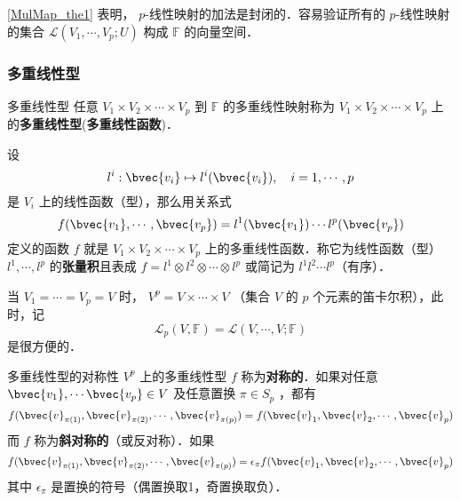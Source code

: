 \autoref{MulMap_the1} 表明， $p$-线性映射的加法是封闭的．容易验证所有的 $p$-线性映射的集合 $\mathcal{L}(V_1,\cdots,V_p;U)$ 构成 $\mathbb{F}$ 的向量空间．
\subsubsection{多重线性型}
\begin{definition}{多重线性型}\label{MulMap_def2}
任意 $V_1\times V_2\times\cdots\times V_p$ 到 $\mathbb{F}$ 的多重线性映射称为 $V_1\times V_2\times\cdots\times V_p$ 上的\textbf{多重线性型}(\textbf{多重线性函数})．
\end{definition}
\begin{example}{}
设
\begin{equation}
l^i:\bvec{v_i}\mapsto l^i(\bvec{v_i}),\quad i=1,\cdots,p
\end{equation}
是 $V_i$ 上的线性函数（型），那么用关系式
\begin{equation}
f(\bvec{v_1},\cdots,\bvec{v_p})=l^1(\bvec{v_1})\cdots l^p(\bvec{v_p})
\end{equation}
定义的函数 $f$ 就是 $V_1\times V_2\times\cdots\times V_p$ 上的多重线性函数．称它为线性函数（型）$l^1,\cdots,l^p$ 的\textbf{张量积}且表成 $f=l^1\otimes l^2\otimes\cdots\otimes l^p$ 或简记为 $l^1l^2\cdots l^p$（有序）．
\end{example}
当 $V_1=\cdots=V_p=V$ 时， $V^p=V\times\cdots\times V$ （集合 $V$ 的 $p$ 个元素的笛卡尔积），此时，记
\begin{equation}
\mathcal{L}_p(V,\mathbb{F})=\mathcal{L}(V,\cdots,V;\mathbb{F})
\end{equation}
是很方便的．
\begin{definition}{多重线性型的对称性}\label{MulMap_def1}
$V^p$ 上的多重线性型 $f$ 称为\textbf{对称的}．如果对任意 $\bvec{v_1},\cdots\bvec{v_p}\in V$ 及任意置换 $\pi\in S_p$ ，都有
\begin{equation}
f(\bvec{v}_{\pi(1)},\bvec{v}_{\pi(2)},\cdots,\bvec{v}_{\pi(p)})=f(\bvec{v}_1,\bvec{v}_2,\cdots,\bvec{v}_p)
\end{equation}
而 $f$ 称为\textbf{斜对称的}（或反对称）．如果
\begin{equation}
f(\bvec{v}_{\pi(1)},\bvec{v}_{\pi(2)},\cdots,\bvec{v}_{\pi(p)})=\epsilon_\pi f(\bvec{v}_1,\bvec{v}_2,\cdots,\bvec{v}_p)
\end{equation}
其中 $\epsilon_\pi$ 是置换的符号（偶置换取1，奇置换取负）．
\end{definition}